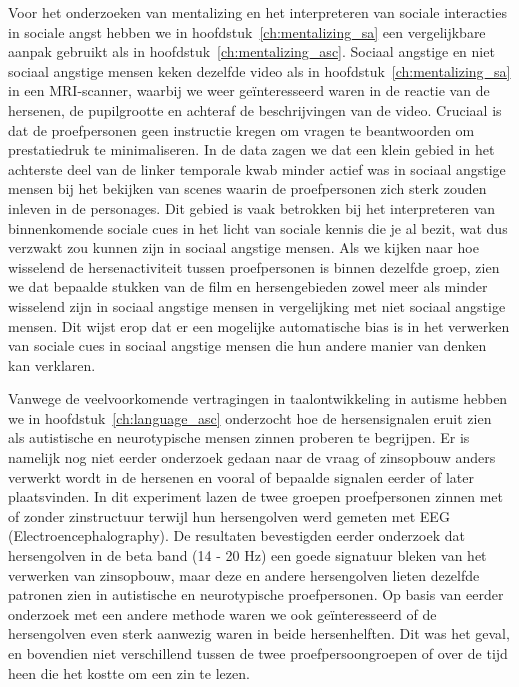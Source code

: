Voor het onderzoeken van mentalizing en het interpreteren van sociale interacties in sociale angst hebben we in hoofdstuk~\ref{ch:mentalizing_sa} een vergelijkbare aanpak gebruikt als in hoofdstuk~\ref{ch:mentalizing_asc}. Sociaal angstige en niet sociaal angstige mensen keken dezelfde video als in hoofdstuk~\ref{ch:mentalizing_sa} in een MRI-scanner, waarbij we weer ge\"interesseerd waren in de reactie van de hersenen, de pupilgrootte en achteraf de beschrijvingen van de video. Cruciaal is dat de proefpersonen geen instructie kregen om vragen te beantwoorden om prestatiedruk te minimaliseren. In de data zagen we dat een klein gebied in het achterste deel van de linker temporale kwab minder actief was in sociaal angstige mensen bij het bekijken van scenes waarin de proefpersonen zich sterk zouden inleven in de personages. Dit gebied is vaak betrokken bij het interpreteren van binnenkomende sociale cues in het licht van sociale kennis die je al bezit, wat dus verzwakt zou kunnen zijn in sociaal angstige mensen. Als we kijken naar hoe wisselend de hersenactiviteit tussen proefpersonen is binnen dezelfde groep, zien we dat bepaalde stukken van de film en hersengebieden zowel meer als minder wisselend zijn in sociaal angstige mensen in vergelijking met niet sociaal angstige mensen. Dit wijst erop dat er een mogelijke automatische bias is in het verwerken van sociale cues in sociaal angstige mensen die hun andere manier van denken kan verklaren. 

Vanwege de veelvoorkomende vertragingen in taalontwikkeling in autisme hebben we in hoofdstuk~\ref{ch:language_asc} onderzocht hoe de hersensignalen eruit zien als autistische en neurotypische mensen zinnen proberen te begrijpen. Er is namelijk nog niet eerder onderzoek gedaan naar de vraag of zinsopbouw anders verwerkt wordt in de hersenen en vooral of bepaalde signalen eerder of later plaatsvinden. In dit experiment lazen de twee groepen proefpersonen zinnen met of zonder zinstructuur terwijl hun hersengolven werd gemeten met EEG (Electroencephalography). De resultaten bevestigden eerder onderzoek dat hersengolven in de beta band (14 - 20 Hz) een goede signatuur bleken van het verwerken van zinsopbouw, maar deze en andere hersengolven lieten dezelfde patronen zien in autistische en neurotypische proefpersonen. Op basis van eerder onderzoek met een andere methode waren we ook ge\"interesseerd of de hersengolven even sterk aanwezig waren in beide hersenhelften. Dit was het geval, en bovendien niet verschillend tussen de twee proefpersoongroepen of over de tijd heen die het kostte om een zin te lezen.

